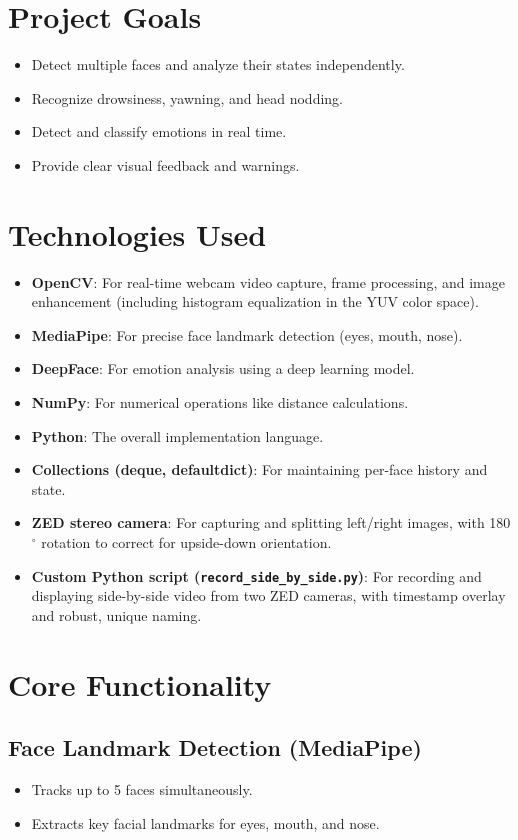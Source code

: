 \documentclass[12pt]{article}
\begin{document}
\section{Project Goals}
\begin{itemize}
    \item Detect multiple faces and analyze their states independently.
    \item Recognize drowsiness, yawning, and head nodding.
    \item Detect and classify emotions in real time.
    \item Provide clear visual feedback and warnings.
\end{itemize}

\section{Technologies Used}
\begin{itemize}
    \item \textbf{OpenCV}: For real-time webcam video capture, frame processing, and image enhancement (including histogram equalization in the YUV color space).
    \item \textbf{MediaPipe}: For precise face landmark detection (eyes, mouth, nose).
    \item \textbf{DeepFace}: For emotion analysis using a deep learning model.
    \item \textbf{NumPy}: For numerical operations like distance calculations.
    \item \textbf{Python}: The overall implementation language.
    \item \textbf{Collections (deque, defaultdict)}: For maintaining per-face history and state.
    \item \textbf{ZED stereo camera}: For capturing and splitting left/right images, with 180$^\circ$ rotation to correct for upside-down orientation.
    \item \textbf{Custom Python script (\texttt{record\_side\_by\_side.py})}: For recording and displaying side-by-side video from two ZED cameras, with timestamp overlay and robust, unique naming.
\end{itemize}

\section{Core Functionality}
\subsection{Face Landmark Detection (MediaPipe)}
\begin{itemize}
    \item Tracks up to 5 faces simultaneously.
    \item Extracts key facial landmarks for eyes, mouth, and nose.
\end{itemize}
\end{document}

